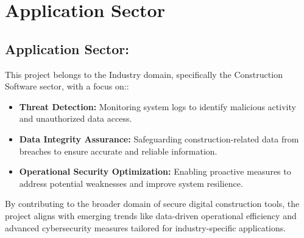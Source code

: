 %
%

\chapter{Application Sector}

\section{Application Sector:}

This project belongs to the Industry domain, specifically the Construction Software sector, with a focus on::

\begin{itemize}
	\item \textbf{Threat Detection:} Monitoring system logs to identify malicious activity and unauthorized data access.
	\item \textbf{Data Integrity Assurance:} Safeguarding construction-related data from breaches to ensure accurate and reliable information.
	\item \textbf{Operational Security Optimization:} Enabling proactive measures to address potential weaknesses and improve system resilience.
\end{itemize}
  
By contributing to the broader domain of secure digital construction tools, the project aligns with emerging trends like data-driven operational efficiency and advanced cybersecurity measures tailored for industry-specific applications.